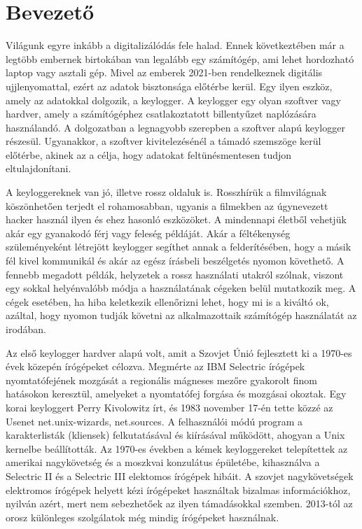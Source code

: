 \documentclass[12pt,a4paper,oneside]{report}
\begin{document}
 







\renewcommand{\contentsname}{Tartalomjegyzék}
\tableofcontents\vfill
\thispagestyle{empty}
\cleardoublepage


\hyphenchar{}
\sloppy

\chapter{Bevezető}\label{sec:intro}
Világunk egyre inkább a digitalizálódás fele halad. Ennek következtében már a legtöbb embernek birtokában van legalább egy számítógép, ami lehet hordozható laptop vagy asztali gép. Mivel az emberek 2021-ben rendelkeznek digitális ujjlenyomattal, ezért az adatok bisztonsága előtérbe kerül. Egy ilyen eszköz, amely az adatokkal dolgozik, a keylogger. A keylogger egy olyan szoftver vagy hardver, amely a számítógéphez csatlakoztatott billentyűzet naplózására használandó. A dolgozatban a legnagyobb szerepben a szoftver alapú keylogger részesül. Ugyanakkor, a szoftver kivitelezésénél a támadó szemszöge kerül előtérbe, akinek az a célja, hogy adatokat feltünésmentesen tudjon eltulajdonítani.

A keyloggereknek van jó, illetve rossz oldaluk is. Rosszhírük a filmvilágnak köszönhetően terjedt el rohamosabban, ugyanis a filmekben az úgynevezett hacker használ ilyen és ehez hasonló eszközöket. A mindennapi életből vehetjük akár egy gyanakodó férj vagy feleség példáját. Akár a féltékenység szüleményeként létrejött keylogger segíthet annak a felderítésében, hogy a másik fél kivel kommunikál és akár az egész írásbeli beszélgetés nyomon követhető. A fennebb megadott példák, helyzetek a rossz használati utakról szólnak, viszont egy sokkal helyénvalóbb módja a használatának cégeken belül mutatkozik meg. A cégek esetében, ha hiba keletkezik ellenőrizni lehet, hogy mi is a kiváltó ok, azáltal, hogy nyomon tudják követni az alkalmazottaik számítógép használatát az irodában.

Az első keylogger hardver alapú volt, amit a Szovjet Únió fejlesztett ki a 1970-es évek közepén írógépeket célozva. Megmérte az IBM Selectric írógépek nyomtatófejének mozgását a regionális mágneses mezőre gyakorolt finom hatásokon keresztül, amelyeket a nyomtatófej forgása és mozgásai okoztak. Egy korai keyloggert Perry Kivolowitz írt, és 1983 november 17-én tette közzé az Usenet net.unix-wizards, net.sources. A felhasználói módú program a karakterlisták (kliensek) felkutatásával és kiírásával működött, ahogyan a Unix kernelbe beállították. Az 1970-es években a kémek keyloggereket telepítettek az amerikai nagykövetség és a moszkvai konzulátus épületébe, kihasználva a Selectric II és a Selectric III elektomos írógépek hibáit. A szovjet nagykövetségek elektromos írógépek helyett kézi írógépeket használtak bizalmas információkhoz, nyilván azért, mert nem sebezhetőek az ilyen támadásokkal szemben. 2013-tól az orosz különleges szolgálatok még mindig írógépeket használnak.
\end{document}
